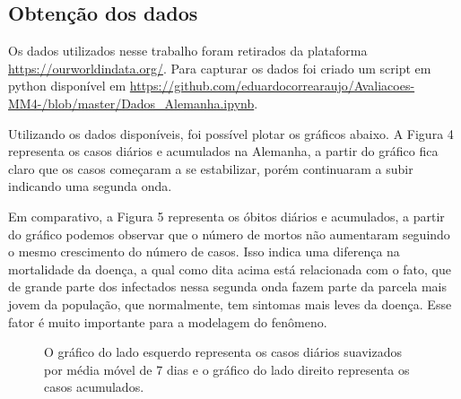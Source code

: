 \documentclass[12pt]{article}
\begin{document}
\subsection{Obtenção dos dados}

Os dados utilizados nesse trabalho foram retirados da plataforma \url{https://ourworldindata.org/}. Para capturar os dados foi criado um script em python disponível em \url{https://github.com/eduardocorrearaujo/Avaliacoes-MM4-/blob/master/Dados_Alemanha.ipynb}.

Utilizando os dados disponíveis, foi possível plotar os gráficos abaixo. A Figura 4 representa os casos diários e acumulados na Alemanha, a partir do gráfico fica claro que os casos começaram a se estabilizar, porém continuaram a subir indicando uma segunda onda.

Em comparativo, a Figura 5 representa os óbitos diários e acumulados, a partir do gráfico podemos observar que o número de mortos não aumentaram seguindo o mesmo crescimento do número de casos. Isso indica uma diferença na mortalidade da doença, a qual como dita acima está relacionada com o fato, que de grande parte dos infectados nessa segunda onda fazem parte da parcela mais jovem da população, que normalmente, tem sintomas mais leves da doença. Esse fator é muito importante para a modelagem do fenômeno.

\begin{figure}[h]

\center
{}
\qquad
{}
\caption{O gráfico do lado esquerdo representa os casos diários suavizados por média móvel de 7 dias e o gráfico do lado direito representa os casos acumulados.}

\end{figure}
\end{document}
